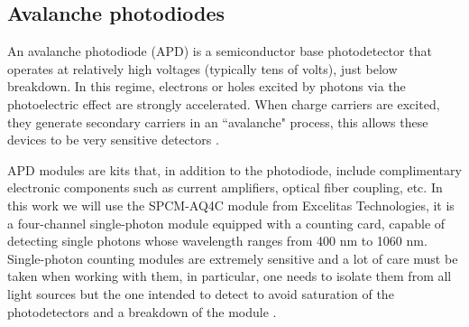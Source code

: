 \documentclass[12pt]{book}
\begin{document}
\begin{figure}[t!]
\begin{floatrow}
\end{floatrow}
\end{figure}


\subsection{Avalanche photodiodes}

An avalanche photodiode (APD) is a semiconductor base photodetector that operates at relatively high voltages (typically tens of volts), just below breakdown. In this regime, electrons or holes excited by photons via the photoelectric effect are strongly accelerated. When charge carriers are excited, they generate secondary carriers in an ``avalanche" process, this allows these devices to be very sensitive detectors \cite{bachor}.

APD modules are kits that, in addition to the photodiode, include complimentary electronic components such as current amplifiers, optical fiber coupling, etc. In this work we will use the SPCM-AQ4C module from Excelitas Technologies, it is a four-channel single-photon module equipped with a counting card, capable of detecting single photons whose wavelength ranges from 400 nm to 1060 nm. Single-photon counting modules are extremely sensitive and a lot of care must be taken when working with them, in particular, one needs to isolate them from all light sources but the one intended to detect to avoid saturation of the photodetectors and a breakdown of the module \cite{manual}.
\end{document}
